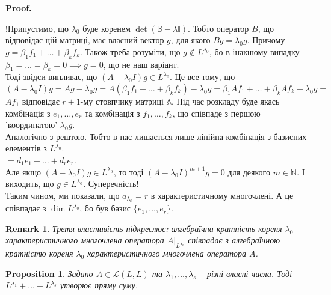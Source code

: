\documentclass[a4paper, 10pt]{article}
\makeatletter
\theoremstyle{theoremdd}
\newtheorem{proposition}[theorem]{Proposition}
\newtheorem{remark}[theorem]{Remark}
\renewenvironment{proof}[1][Proof.\\]{\par
\pushQED{\hfill \qed}%
\normalfont \topsep6\p@\@plus6\p@\relax
\trivlist
\item\relax
{\bfseries
#1\@addpunct{.}}\hspace\labelsep\ignorespaces
}{%
\popQED\endtrivlist\@endpefalse
}
\makeatother
\begin{document}
\begin{proof}
!Припустимо, що $\lambda_0$ буде коренем $\det (\mathbb{B}-\lambda \mathbb{I})$. Тобто оператор $B$, що відповідає цій матриці, має власний вектор $g$, для якого $Bg = \lambda_0 g$. Причому $g = \beta_1 f_1 + \dots + \beta_k f_k$. Також треба розуміти, що $g \notin L^{\lambda_0}$, бо в інакшому випадку $\beta_1=\dots=\beta_k = 0 \implies g = 0$, що не наш варіант.\\
Тоді звідси випливає, що $(A-\lambda_0 I)g \in L^{\lambda_0}$. Це все тому, що\\
$(A-\lambda_0 I)g = Ag - \lambda_0 g = A(\beta_1 f_1 + \dots + \beta_k f_k) - \lambda_0 g = \beta_1 A f_1 + \dots + \beta_k A f_k - \lambda_0 g \boxed{=}$\\
$Af_1$ відповідає $r+1$-му стовпчику матриці $\mathbb{A}$. Під час розкладу буде якась комбінація з $e_1,\dots,e_r$ та комбінація з $f_1,\dots,f_k$, що співпаде з першою 'координатою' $\lambda_0 g$.\\
Аналогічно з рештою. Тобто в нас лишається лише лінійна комбінація з базисних елементів з $L^{\lambda_0}$.\\
$\boxed{=} d_1 e_1 + \dots + d_r e_r$.\\
Але якщо $(A-\lambda_0 I)g \in L^{\lambda_0}$, то тоді $(A-\lambda_0 I)^{m+1} g = 0$ для деякого $m \in \mathbb{N}$. І виходить, що $g \in L^{\lambda_0}$. Суперечність!\\
Таким чином, ми показали, що $a_{\lambda_0} = r$ в характеристичному многочлені. А це співпадає з $\dim L^{\lambda_0}$, бо був базис $\{e_1,\dots,e_r\}$.
\end{proof}

\begin{remark}
Третя властивість підкреслює: алгебраїчна кратність кореня $\lambda_0$ характеристичного многочлена оператора $A|_{L^{\lambda_0}}$ співпадає з алгебраїчною кратністю кореня $\lambda_0$ характеристичного многочлена оператора $A$.
\end{remark}

\begin{proposition}
Задано $A \in \mathcal{L}(L,L)$ та $\lambda_1,\dots,\lambda_s$ -- різні власні числа. Тоді $L^{\lambda_1}+\dots +L^{\lambda_s}$ утворює пряму суму.
\end{proposition}
\end{document}
